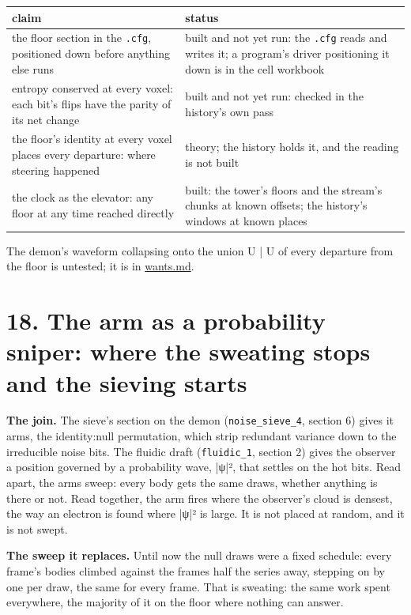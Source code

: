 {\small
\setlength{\tabcolsep}{6pt}
\begin{longtable}{>{\RaggedRight\arraybackslash}p{}>{\RaggedRight\arraybackslash}p{}}
\toprule
claim & status \\
\midrule
\endhead
the floor section in the \texttt{.\allowbreak{}cfg}, positioned down before anything else runs & built and not yet run: the \texttt{.\allowbreak{}cfg} reads and writes it; a program's driver positioning it down is in the cell workbook \\
entropy conserved at every voxel: each bit's flips have the parity of its net change & built and not yet run: checked in the history's own pass \\
the floor's identity at every voxel places every departure: where steering happened & theory; the history holds it, and the reading is not built \\
the clock as the elevator: any floor at any time reached directly & built: the tower's floors and the stream's chunks at known offsets; the history's windows at known places \\
\bottomrule
\end{longtable}
}

The demon's waveform collapsing onto the union U | U of every departure from the floor is untested; it is in \hyperref[chap:wants]{wants.md}.

\section{\texorpdfstring{18. The arm as a probability sniper: where the sweating stops and the sieving starts}{18. The arm as a probability sniper: where the sweating stops and the sieving starts}}

\textbf{The join.} The sieve's section on the demon (\texttt{noise\_\allowbreak{}sieve\_\allowbreak{}4}, section 6) gives it arms, the identity:null permutation, which strip redundant variance down to the irreducible noise bits. The fluidic draft (\texttt{fluidic\_\allowbreak{}1}, section 2) gives the observer a position governed by a probability wave, |ψ|², that settles on the hot bits. Read apart, the arms sweep: every body gets the same draws, whether anything is there or not. Read together, the arm fires where the observer's cloud is densest, the way an electron is found where |ψ|² is large. It is not placed at random, and it is not swept.

\textbf{The sweep it replaces.} Until now the null draws were a fixed schedule: every frame's bodies climbed against the frames half the series away, stepping on by one per draw, the same for every frame. That is sweating: the same work spent everywhere, the majority of it on the floor where nothing can answer.

